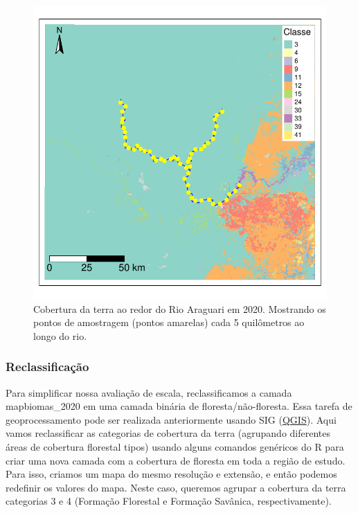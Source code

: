 \documentclass[
]{article}
\begin{document}
\begin{figure}
\centering
\includegraphics{epr_files/figure-latex/unnamed-chunk-11-1.pdf}
\caption{\label{fig:unnamed-chunk-11} Cobertura da terra ao redor do Rio Araguari em 2020. Mostrando os pontos de amostragem (pontos amarelas) cada 5 quilômetros ao longo do rio.}
\end{figure}

\newpage

\hypertarget{reclassificauxe7uxe3o}{%
\subsubsection{Reclassificação}\label{reclassificauxe7uxe3o}}

Para simplificar nossa avaliação de escala, reclassificamos a camada mapbiomas\_2020 em uma camada binária de floresta/não-floresta. Essa tarefa de geoprocessamento pode ser realizada anteriormente usando SIG (\href{https://docs.qgis.org/3.22/pt_BR/docs/training_manual/rasters/terrain_analysis.html\#moderate-fa-reclassifying-the-raster}{QGIS}). Aqui vamos reclassificar as categorias de cobertura da terra (agrupando diferentes áreas de cobertura florestal tipos) usando alguns comandos genéricos do R para criar uma nova camada com a cobertura de floresta em toda a região de estudo. Para isso, criamos um mapa do mesmo resolução e extensão, e então podemos redefinir os valores do mapa. Neste caso, queremos agrupar a cobertura da terra categorias 3 e 4 (Formação Florestal e Formação Savânica, respectivamente).
\end{document}
